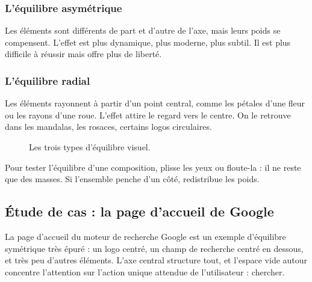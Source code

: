 \subsubsection{L'équilibre asymétrique}

Les éléments sont différents de part et d'autre de l'axe, mais leurs poids se compensent. L'effet est plus dynamique, plus moderne, plus subtil. Il est plus difficile à réussir mais offre plus de liberté.

\subsubsection{L'équilibre radial}

Les éléments rayonnent à partir d'un point central, comme les pétales d'une fleur ou les rayons d'une roue. L'effet attire le regard vers le centre. On le retrouve dans les mandalas, les rosaces, certains logos circulaires.

\begin{figure}[ht]
\centering
{}
\caption{Les trois types d'équilibre visuel.}
\end{figure}

\begin{astuce}
Pour tester l'équilibre d'une composition, plisse les yeux ou floute-la : il ne reste que des masses. Si l'ensemble penche d'un côté, redistribue les poids.
\end{astuce}

\subsection{Étude de cas : la page d'accueil de Google}

La page d'accueil du moteur de recherche Google est un exemple d'équilibre symétrique très épuré : un logo centré, un champ de recherche centré en dessous, et très peu d'autres éléments. L'axe central structure tout, et l'espace vide autour concentre l'attention sur l'action unique attendue de l'utilisateur : chercher.

